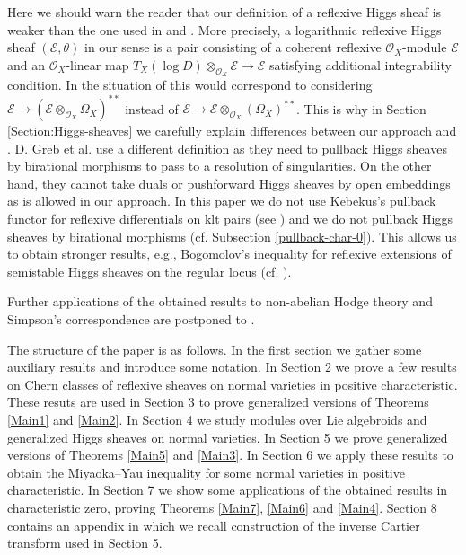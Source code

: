 \documentclass[12pt]{article}
\theoremstyle{plain}
\theoremstyle{definition}
\theoremstyle{remark}
\newcommand{\cE}{{\mathcal E}}
\newcommand{\cO}{{\mathcal O}}
\begin{document}
\medskip

Here we should  warn the reader that our definition of a reflexive Higgs sheaf is weaker than the one used in \cite{GKPT2} and \cite{GKPT1}. More precisely, a logarithmic reflexive Higgs sheaf $(\cE, \theta)$  in our sense is a pair consisting of a coherent reflexive $\cO_X$-module $\cE$ and an $\cO_X$-linear map $T_X (\log D)\otimes _{\cO_X} \cE\to \cE$ satisfying additional integrability condition. In the situation of \cite{GKPT2} this would correspond to considering 
$\cE\to (\cE\otimes_{\cO_X} \Omega _X)^{**}$ instead of $\cE\to \cE\otimes _{\cO_X}(\Omega _X)^{**}$.
This is  why in Section \ref{Section:Higgs-sheaves} we carefully explain differences between our approach and \cite{GKPT2}. D. Greb et al. use a different definition as they need to pullback Higgs sheaves by birational morphisms to pass to a resolution of singularities. On the other hand, they cannot take duals or pushforward Higgs sheaves by open embeddings as is allowed in our approach. In this paper we do not use  Kebekus's pullback functor for reflexive differentials on klt pairs (see \cite{Ke}) and we do not pullback Higgs sheaves by birational morphisms  (cf. Subsection \ref{pullback-char-0}).  This allows us to obtain stronger results, e.g., Bogomolov's inequality for reflexive extensions of semistable Higgs sheaves on the regular locus (cf. \cite[Theorem 6.1]{GKPT2}). 





\medskip

Further applications of the obtained results to non-abelian Hodge theory and Simpson's correspondence are 
postponed to \cite{La9}.


\medskip


The structure of the paper is as follows. In the first section we gather some auxiliary results and introduce some notation. In Section 2 we prove a few results on Chern classes of reflexive sheaves on normal varieties in positive characteristic. These resuts are used in Section 3 to prove generalized versions of Theorems \ref{Main1} and \ref{Main2}. In Section 4 we study modules over Lie algebroids and generalized Higgs sheaves on normal varieties. In Section 5 we prove generalized versions of Theorems  \ref{Main5} and \ref{Main3}. In Section 6 we apply these results to obtain the Miyaoka--Yau inequality for some normal varieties in positive characteristic. In Section 7 we show some applications of the obtained results in characteristic zero, proving Theorems \ref{Main7}, \ref{Main6} and \ref{Main4}.
Section 8 contains an appendix in which we recall construction of the inverse Cartier  transform  used in Section 5.
\end{document}
